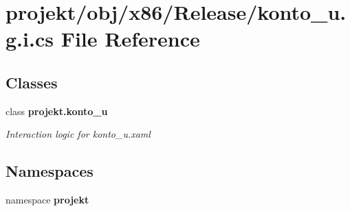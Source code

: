 \section{projekt/obj/x86/\+Release/konto\+\_\+u.g.\+i.\+cs File Reference}
\label{x86_2Release_2konto__u_8g_8i_8cs}
\subsection*{Classes}
\begin{DoxyCompactItemize}
\item 
class \textbf{ projekt.\+konto\+\_\+u}
\begin{DoxyCompactList}\small\item\em Interaction logic for konto\+\_\+u.\+xaml \end{DoxyCompactList}\end{DoxyCompactItemize}
\subsection*{Namespaces}
\begin{DoxyCompactItemize}
\item 
namespace \textbf{ projekt}
\end{DoxyCompactItemize}
